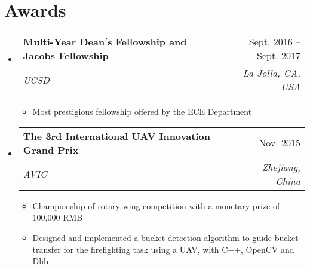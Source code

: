 \documentclass[letterpaper,11pt]{article}
\makeatletter
\newcommand{\resumeItem}[1]{
  \item\small{
    {#1 \vspace{-2pt}}
  }
}
\newcommand{\resumeSubheading}[4]{
  \vspace{-2pt}\item
    \begin{tabular*}{0.97\textwidth}[t]{l@{\extracolsep{\fill}}r}
      \textbf{#1} & #2 \\
      \textit{\small#3} & \textit{\small #4} \\
    \end{tabular*}\vspace{-7pt}
}
\newcommand{\resumeProjectHeading}[2]{
    \item
    \begin{tabular*}{0.97\textwidth}{l@{\extracolsep{\fill}}r}
      \small#1 & #2 \\
    \end{tabular*}\vspace{-7pt}
}
\newcommand{\resumeSubHeadingListStart}{\begin{itemize}[leftmargin=0.15in, label={}]}
\newcommand{\resumeSubHeadingListEnd}{\end{itemize}}
\newcommand{\resumeItemListStart}{\begin{itemize}}
\newcommand{\resumeItemListEnd}{\end{itemize}\vspace{-5pt}}
\makeatother
\begin{document}
  
\section{Awards}
  \resumeSubHeadingListStart

    \resumeSubheading
      {Multi-Year Dean$'$s Fellowship and Jacobs Fellowship}{Sept. 2016 -- Sept. 2017}
      {\textsc{UCSD}}{La Jolla, CA, USA}
      \resumeItemListStart
        \resumeItem{Most prestigious fellowship offered by the ECE Department}
      \resumeItemListEnd

    \resumeSubheading
      {The 3rd International UAV Innovation Grand Prix}{Nov. 2015}
      {AVIC}{Zhejiang, China}
      \resumeItemListStart
        \resumeItem{Championship of rotary wing competition with a monetary prize of 100,000 RMB}
        \resumeItem{Designed and implemented a bucket detection algorithm to guide bucket transfer for the firefighting task using a UAV, with C++, OpenCV and Dlib}
      \resumeItemListEnd

  \resumeSubHeadingListEnd
  
\end{document}
